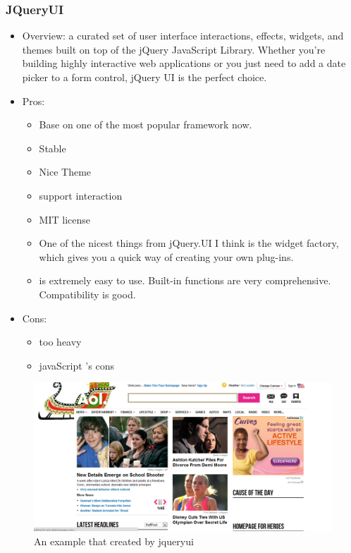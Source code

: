\documentclass[14pt,a4paper]{extreport}
\begin{document}
		\subsubsection{JQueryUI}
			\begin{itemize}
				\item Overview: a curated set of user interface interactions, effects, widgets, and themes built on top of the jQuery JavaScript Library. Whether you're building highly interactive web applications or you just need to add a date picker to a form control, jQuery UI is the perfect choice.
				\item Pros: 
					\begin{itemize}
						\item Base on one of the most popular framework now.
						\item Stable
						\item Nice Theme
						\item support interaction
						\item MIT license
						\item One of the nicest things from jQuery.UI I think is the widget factory, which gives you a quick way of creating your own plug-ins.
						\item is extremely easy to use. Built-in functions are very comprehensive. Compatibility is good.
					\end{itemize}
				\item Cons:
					\begin{itemize}
						\item too heavy
						\item javaScript 's cons
					
					\end{itemize}
			\end{itemize}
			\begin{figure}
				\begin{center}
				\includegraphics[scale=0.5]{jqueryui.png}
				\caption{An example that created by jqueryui}
				\end{center}
			\end{figure}
\end{document}

